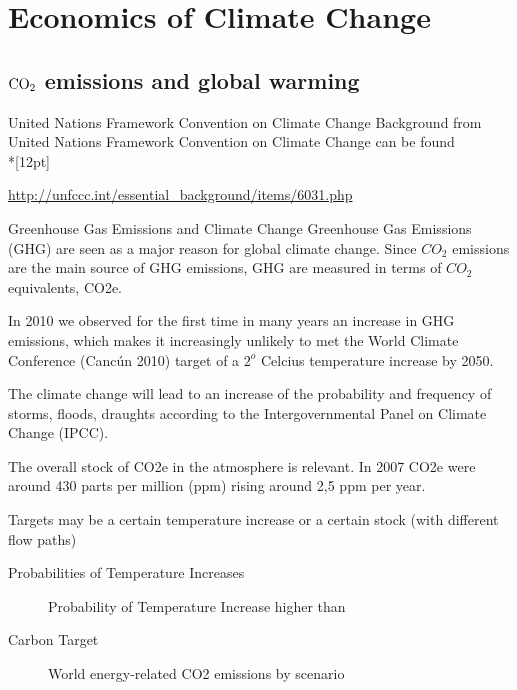 \section{Economics of Climate Change}
\subsection[Emissions]{$\textnormal{CO}_2$ emissions and global warming}

United Nations Framework Convention on Climate Change
	Background from United Nations Framework Convention on Climate Change can be found\\*[12pt]

	\url{http://unfccc.int/essential_background/items/6031.php}


Greenhouse Gas Emissions and Climate Change
	Greenhouse Gas Emissions (GHG) are seen as a major reason for global climate change. 
	Since ${CO}_2$ emissions are the main source of GHG emissions, GHG are measured in 
	terms of ${CO}_2$ equivalents, CO2e.
	
	In 2010 we observed for the first time in many years an increase in GHG emissions, 
	which makes it increasingly unlikely to met the World Climate Conference (Canc{\'u}n 2010) 
	target of a $2^o$ Celcius temperature increase by 2050.

	The climate change will lead to an increase of the probability and frequency of storms, floods, 
	draughts according to the Intergovernmental Panel on Climate Change (IPCC).
	
	The overall stock of CO2e in the atmosphere is relevant. In 2007 CO2e were around 430 parts per 
	million (ppm) rising around 2,5 ppm per year.
	
	Targets may be a certain temperature increase or a certain stock (with different flow paths)


Probabilities of Temperature Increases
	\begin{center}
	\begin{figure}[h!]
	\centering
	\caption{Probability of Temperature Increase higher than}
	\label{fig:temperature}
	\end{figure}
	\end{center}


Carbon Target
\begin{center}
\begin{figure}[h!]
\centering
{} %
\caption{World energy-related CO2 emissions by scenario}
\label{fig:emissions}
\end{figure}
\end{center}


